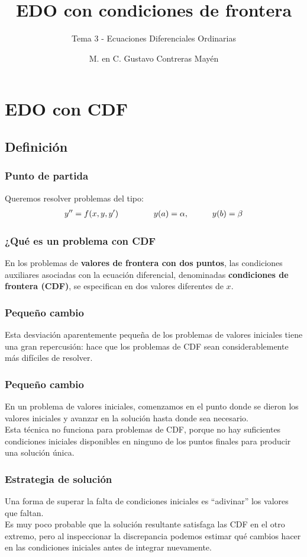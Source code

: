 \documentclass[12pt]{beamer}
\title{\large{EDO con condiciones de frontera}}
\subtitle{Tema 3 - Ecuaciones Diferenciales Ordinarias}
\author{M. en C. Gustavo Contreras Mayén}
\date{}
\begin{document}
\maketitle

\section{EDO con CDF}
\subsection{Definición}

\begin{frame}
\frametitle{Punto de partida}
Queremos resolver problemas del tipo:
\pause
\begin{align*}
{y}^{\prime \prime} = f (x, y, {y}^{\prime}) \hspace{1.5cm} y (a) = \alpha, \hspace{1cm} y (b) = \beta
\end{align*}
\end{frame}
\begin{frame}
\frametitle{¿Qué es un problema con CDF}
En los problemas de \textbf{\textcolor{ao(english)}{valores de frontera con dos puntos}}, las condiciones auxiliares asociadas con la ecuación diferencial, denominadas \textbf{condiciones de frontera (CDF)}, se especifican en dos valores diferentes de $x$.
\end{frame}
\begin{frame}
\frametitle{Pequeño cambio}
Esta desviación aparentemente pequeña de los problemas de valores iniciales tiene una gran repercusión: \pause hace que los problemas de CDF sean considerablemente más difíciles de resolver.
\end{frame}
\begin{frame}
\frametitle{Pequeño cambio}
En un problema de valores iniciales, comenzamos en el punto donde se dieron los valores iniciales y avanzar en la solución hasta donde sea necesario.
\\
\bigskip
\pause
Esta técnica no funciona para problemas de CDF, \pause porque no hay suficientes condiciones iniciales disponibles en ninguno de los puntos finales para producir una solución única.
\end{frame}
\begin{frame}
\frametitle{Estrategia de solución}
Una forma de superar la falta de condiciones iniciales es \enquote{adivinar} los valores que faltan.
\\
\bigskip
\pause
Es muy poco probable que la solución resultante satisfaga las CDF en el otro extremo, \pause  pero al inspeccionar la discrepancia podemos estimar qué cambios hacer en las condiciones iniciales antes de integrar nuevamente.
\end{frame}
\end{document}
